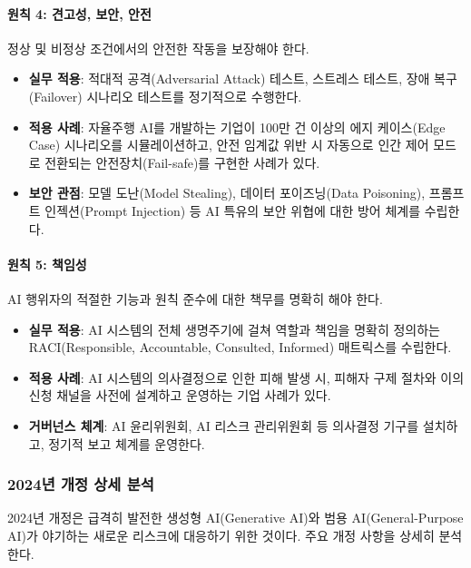 \paragraph{원칙 4: 견고성, 보안, 안전}
정상 및 비정상 조건에서의 안전한 작동을 보장해야 한다.

\begin{itemize}
 \item \textbf{실무 적용}: 적대적 공격(Adversarial Attack) 테스트, 스트레스 테스트, 장애 복구(Failover) 시나리오 테스트를 정기적으로 수행한다.
 \item \textbf{적용 사례}: 자율주행 AI를 개발하는 기업이 100만 건 이상의 에지 케이스(Edge Case) 시나리오를 시뮬레이션하고, 안전 임계값 위반 시 자동으로 인간 제어 모드로 전환되는 안전장치(Fail-safe)를 구현한 사례가 있다.
 \item \textbf{보안 관점}: 모델 도난(Model Stealing), 데이터 포이즈닝(Data Poisoning), 프롬프트 인젝션(Prompt Injection) 등 AI 특유의 보안 위협에 대한 방어 체계를 수립한다.
\end{itemize}

\paragraph{원칙 5: 책임성}
AI 행위자의 적절한 기능과 원칙 준수에 대한 책무를 명확히 해야 한다.

\begin{itemize}
 \item \textbf{실무 적용}: AI 시스템의 전체 생명주기에 걸쳐 역할과 책임을 명확히 정의하는 RACI(Responsible, Accountable, Consulted, Informed) 매트릭스를 수립한다.
 \item \textbf{적용 사례}: AI 시스템의 의사결정으로 인한 피해 발생 시, 피해자 구제 절차와 이의신청 채널을 사전에 설계하고 운영하는 기업 사례가 있다.
 \item \textbf{거버넌스 체계}: AI 윤리위원회, AI 리스크 관리위원회 등 의사결정 기구를 설치하고, 정기적 보고 체계를 운영한다.
\end{itemize}

\subsubsection{2024년 개정 상세 분석}
2024년 개정은 급격히 발전한 생성형 AI(Generative AI)와 범용 AI(General-Purpose AI)가 야기하는 새로운 리스크에 대응하기 위한 것이다. 주요 개정 사항을 상세히 분석한다.

